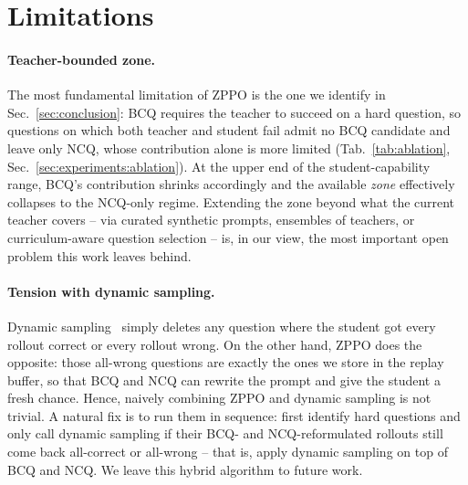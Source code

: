 \documentclass{llmxive}
\begin{document}
\section*{Limitations}
\label{sec:limitations}
\paragraph{Teacher-bounded zone.}
The most fundamental limitation of ZPPO is the one we identify in Sec.~\ref{sec:conclusion}: BCQ requires the teacher to succeed on a hard question, so questions on which both teacher and student fail admit no BCQ candidate and leave only NCQ, whose contribution alone is more limited (Tab.~\ref{tab:ablation}, Sec.~\ref{sec:experiments:ablation}). At the upper end of the student-capability range, BCQ's contribution shrinks accordingly and the available \emph{zone} effectively collapses to the NCQ-only regime. Extending the zone beyond what the current teacher covers -- via curated synthetic prompts, ensembles of teachers, or curriculum-aware question selection -- is, in our view, the most important open problem this work leaves behind.

\paragraph{Tension with dynamic sampling.}
Dynamic sampling~\citep{yu2025dapo} simply deletes any question where the student got every rollout correct or every rollout wrong. On the other hand, ZPPO does the opposite: those all-wrong questions are exactly the ones we store in the replay buffer, so that BCQ and NCQ can rewrite the prompt and give the student a fresh chance. Hence, naively combining ZPPO and dynamic sampling is not trivial. A natural fix is to run them in sequence: first identify hard questions and only call dynamic sampling if their BCQ- and NCQ-reformulated rollouts still come back all-correct or all-wrong -- that is, apply dynamic sampling on top of BCQ and NCQ. We leave this hybrid algorithm to future work.
\end{document}
